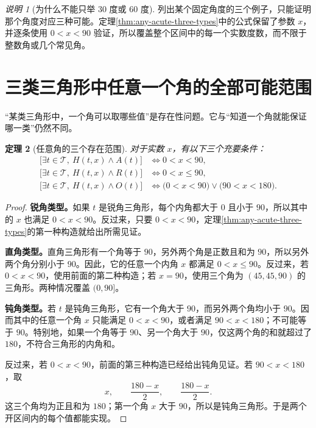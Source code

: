 \documentclass[UTF8,a4paper,zihao=-4,oneside,openany,fontset=fandol]{ctexbook}
\newtheorem{theorem}{定理}[chapter]
\theoremstyle{definition}
\theoremstyle{remark}
\newtheorem{remark}[theorem]{说明}
\begin{document}
\begin{remark}[为什么不能只举 30 度或 60 度]
列出某个固定角度的三个例子，只能证明那个角度对应三种可能。定理\ref{thm:any-acute-three-types}中的公式保留了参数 $x$，并逐条使用 $0<x<90$ 验证，所以覆盖整个区间中的每一个实数度数，而不限于整数角或几个常见角。
\end{remark}

\section{三类三角形中任意一个角的全部可能范围}

“某类三角形中，一个角可以取哪些值”是存在性问题。它与“知道一个角就能保证哪一类”仍然不同。

\begin{theorem}[任意角的三个存在范围]
\label{thm:any-angle-existence}
对于实数 $x$，有以下三个充要条件：
\begin{align*}
\bigl[\exists t\in\mathcal T,\ H(t,x)\land A(t)\bigr]
&\Longleftrightarrow 0<x<90,\\
\bigl[\exists t\in\mathcal T,\ H(t,x)\land R(t)\bigr]
&\Longleftrightarrow 0<x\le90,\\
\bigl[\exists t\in\mathcal T,\ H(t,x)\land O(t)\bigr]
&\Longleftrightarrow
\bigl(0<x<90\bigr)\lor\bigl(90<x<180\bigr).
\end{align*}
\end{theorem}

\begin{proof}
\textbf{锐角类型。}如果 $t$ 是锐角三角形，每个内角都大于 $0$ 且小于 $90$，所以其中的 $x$ 也满足 $0<x<90$。反过来，只要 $0<x<90$，定理\ref{thm:any-acute-three-types}的第一种构造就给出所需见证。

\textbf{直角类型。}直角三角形有一个角等于 $90$，另外两个角是正数且和为 $90$，所以另外两个角分别小于 $90$。因此，它的任意一个内角 $x$ 都满足 $0<x\le90$。反过来，若 $0<x<90$，使用前面的第二种构造；若 $x=90$，使用三个角为 $(45,45,90)$ 的三角形。两种情况覆盖 $(0,90]$。

\textbf{钝角类型。}若 $t$ 是钝角三角形，它有一个角大于 $90$，而另外两个角均小于 $90$。因而其中的任意一个角 $x$ 只能满足 $0<x<90$，或者满足 $90<x<180$；不可能等于 $90$。特别地，如果一个角等于 $90$、另一个角大于 $90$，仅这两个角的和就超过了 $180$，不符合三角形的内角和。

反过来，若 $0<x<90$，前面的第三种构造已经给出钝角见证。若 $90<x<180$，取
\[
x,\qquad \frac{180-x}{2},\qquad \frac{180-x}{2}.
\]
这三个角均为正且和为 $180$；第一个角 $x$ 大于 $90$，所以是钝角三角形。于是两个开区间内的每个值都能实现。
\end{proof}
\end{document}
